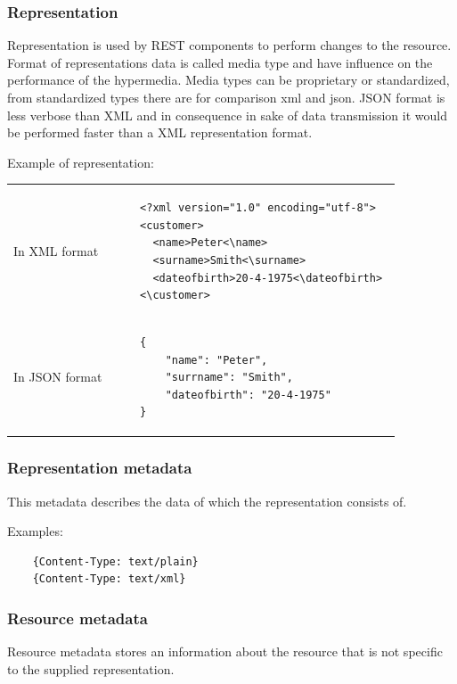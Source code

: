 \subsubsection{Representation}
  Representation is used by REST components to perform changes to the resource. Format of representations data is called media type and have influence on the performance of the hypermedia. Media types can be proprietary or standardized, from standardized types there are for comparison \gls{xml} and \gls{json}. JSON format is less verbose than XML and in consequence in sake of data transmission it would be performed faster than a XML representation format.
  
Example of representation:
\begin{center}
  \begin{tabular}[b]{l l}
    In XML format & \begin{lstlisting}
    <?xml version="1.0" encoding="utf-8">
    <customer> 
      <name>Peter<\name> 
      <surname>Smith<\surname> 
      <dateofbirth>20-4-1975<\dateofbirth> 
    <\customer>
    \end{lstlisting} \\
    
    
    In JSON format & \begin{lstlisting}
    {
        "name": "Peter", 
        "surrname": "Smith", 
        "dateofbirth": "20-4-1975"
    }
    \end{lstlisting}
  \end{tabular}
\end{center}

\subsubsection{Representation metadata}
  This metadata describes the data of which the representation consists of.
  
  Examples: \hfill \\
  \begin{center}
  \begin{lstlisting}
    {Content-Type: text/plain} 
    {Content-Type: text/xml}
  \end{lstlisting}
  \end{center}
  
\subsubsection{Resource metadata}
  Resource metadata stores an information about the resource that is not specific to the supplied representation.
  
